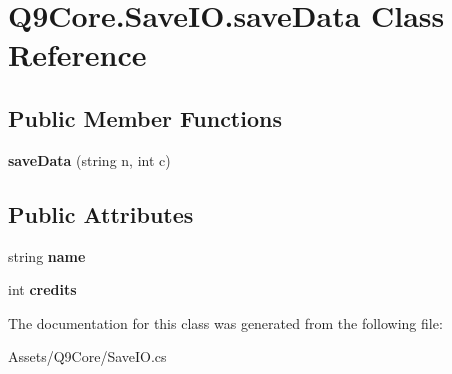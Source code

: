 \hypertarget{class_q9_core_1_1_save_i_o_1_1save_data}{}\section{Q9\+Core.\+Save\+I\+O.\+save\+Data Class Reference}
\label{class_q9_core_1_1_save_i_o_1_1save_data}
\subsection*{Public Member Functions}
\begin{DoxyCompactItemize}
\item 
\mbox{\label{class_q9_core_1_1_save_i_o_1_1save_data_ae750e0051e734d49f0a7da5fb4344bcd}} 
{\bfseries save\+Data} (string n, int c)
\end{DoxyCompactItemize}
\subsection*{Public Attributes}
\begin{DoxyCompactItemize}
\item 
\mbox{\label{class_q9_core_1_1_save_i_o_1_1save_data_a338f5c783f960037d88a7ef090a5e437}} 
string {\bfseries name}
\item 
\mbox{\label{class_q9_core_1_1_save_i_o_1_1save_data_ade330b234e6b0488e1e89e6ec32d5d56}} 
int {\bfseries credits}
\end{DoxyCompactItemize}


The documentation for this class was generated from the following file\+:\begin{DoxyCompactItemize}
\item 
Assets/\+Q9\+Core/Save\+I\+O.\+cs\end{DoxyCompactItemize}
